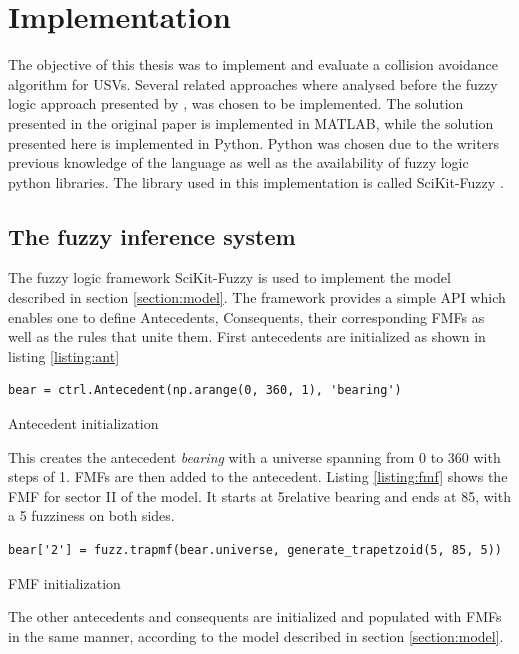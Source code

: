 

\chapter{Implementation}
The objective of this thesis was to implement and evaluate a  collision avoidance  algorithm for USVs. Several related approaches where analysed before the fuzzy logic approach presented by \textcite{perera2012intelligent}, was chosen to be implemented.
The solution presented in the original paper is implemented in MATLAB, while the solution presented here is implemented in Python. Python was chosen due to the writers previous knowledge of the language as well as the availability of fuzzy logic python libraries. The library used in this implementation is called SciKit-Fuzzy \cite{josh_warner_2017_1002946}.
\section{The fuzzy inference system}
The fuzzy logic framework SciKit-Fuzzy is used to implement the model described in section \ref{section:model}. The framework provides a simple API which enables one to define Antecedents, Consequents, their corresponding FMFs as well as the rules that unite them. First antecedents are initialized as shown in listing \ref{listing:ant}
\begin{listing}[ht]
    \begin{verbatim}
bear = ctrl.Antecedent(np.arange(0, 360, 1), 'bearing')
\end{verbatim}
    \caption{Antecedent initialization}
    \label{listing:ant}
\end{listing}
This creates the antecedent \textit{bearing} with a universe spanning from 0 to 360 with steps of 1. FMFs are then added to the antecedent. Listing \ref{listing:fmf} shows the FMF for sector II of the model. It starts at 5\textdegree relative bearing and ends at 85\textdegree, with a 5 \textdegree  fuzziness on both sides.
\begin{listing}[ht]
    \begin{verbatim}
bear['2'] = fuzz.trapmf(bear.universe, generate_trapetzoid(5, 85, 5))
\end{verbatim}
    \caption{FMF initialization}
    \label{listing:fmf}
\end{listing}

The other antecedents and consequents are initialized and populated with FMFs in the same manner, according to the model described in section \ref{section:model}.

